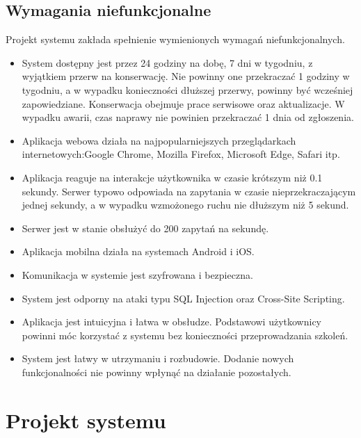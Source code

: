 \subsection{Wymagania niefunkcjonalne}

Projekt systemu zakłada spełnienie wymienionych wymagań niefunkcjonalnych.

\begin{itemize}
    \item System dostępny jest przez 24 godziny na dobę, 7 dni w tygodniu, z wyjątkiem przerw na konserwację. Nie powinny one przekraczać 1 godziny w tygodniu, a w wypadku konieczności dłuższej przerwy, powinny być wcześniej zapowiedziane. Konserwacja obejmuje prace serwisowe oraz aktualizacje. W wypadku awarii, czas naprawy nie powinien przekraczać 1 dnia od zgłoszenia.
    \item Aplikacja webowa działa na najpopularniejszych przeglądarkach internetowych:\linebreak Google Chrome, Mozilla Firefox, Microsoft Edge, Safari itp.
    \item Aplikacja reaguje na interakcje użytkownika w czasie krótszym niż 0.1 sekundy. Serwer typowo odpowiada na zapytania w czasie nieprzekraczającym jednej sekundy, a w wypadku wzmożonego ruchu nie dłuższym niż 5 sekund.
    \item Serwer jest w stanie obsłużyć do 200 zapytań na sekundę.
    \item Aplikacja mobilna działa na systemach Android i iOS.
    \item Komunikacja w systemie jest szyfrowana i bezpieczna.
    \item System jest odporny na ataki typu SQL Injection oraz Cross-Site Scripting.
    \item Aplikacja jest intuicyjna i łatwa w obsłudze. Podstawowi użytkownicy powinni móc korzystać z systemu bez konieczności przeprowadzania szkoleń.
    \item System jest łatwy w utrzymaniu i rozbudowie. Dodanie nowych funkcjonalności nie powinny wpłynąć na działanie pozostałych.
\end{itemize}

\section{Projekt systemu}

